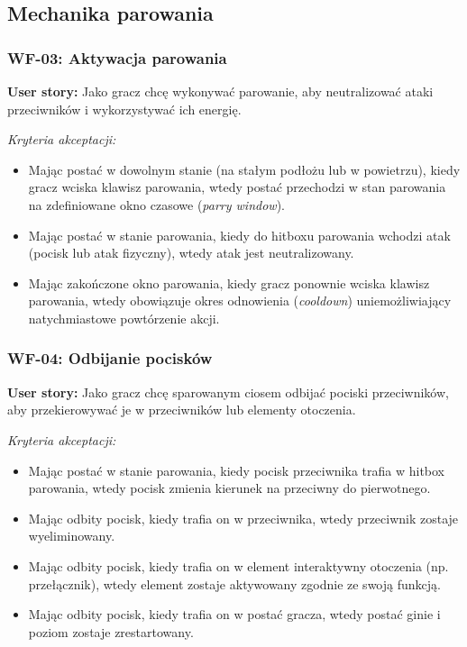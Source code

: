 \subsection{Mechanika parowania}

\subsubsection*{WF-03: Aktywacja parowania}
\textbf{User story:} Jako gracz chcę wykonywać parowanie, aby neutralizować ataki przeciwników i wykorzystywać ich energię.

\textit{Kryteria akceptacji:}
\begin{itemize}[noitemsep]
    \item Mając postać w dowolnym stanie (na stałym podłożu lub w powietrzu), kiedy gracz wciska klawisz parowania, wtedy postać przechodzi w stan parowania na zdefiniowane okno czasowe (\textit{parry window}).
    \item Mając postać w stanie parowania, kiedy do hitboxu parowania wchodzi atak (pocisk lub atak fizyczny), wtedy atak jest neutralizowany.
    \item Mając zakończone okno parowania, kiedy gracz ponownie wciska klawisz parowania, wtedy obowiązuje okres odnowienia (\textit{cooldown}) uniemożliwiający natychmiastowe powtórzenie akcji.
\end{itemize}

\subsubsection*{WF-04: Odbijanie pocisków}
\textbf{User story:} Jako gracz chcę sparowanym ciosem odbijać pociski przeciwników, aby przekierowywać je w przeciwników lub elementy otoczenia.

\textit{Kryteria akceptacji:}
\begin{itemize}[noitemsep]
    \item Mając postać w stanie parowania, kiedy pocisk przeciwnika trafia w hitbox parowania, wtedy pocisk zmienia kierunek na przeciwny do pierwotnego.
    \item Mając odbity pocisk, kiedy trafia on w przeciwnika, wtedy przeciwnik zostaje wyeliminowany.
    \item Mając odbity pocisk, kiedy trafia on w element interaktywny otoczenia (np. przełącznik), wtedy element zostaje aktywowany zgodnie ze swoją funkcją.
    \item Mając odbity pocisk, kiedy trafia on w postać gracza, wtedy postać ginie i poziom zostaje zrestartowany.
\end{itemize}

